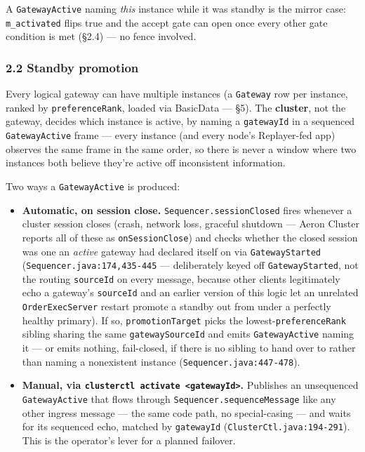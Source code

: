 \documentclass[
  10pt,
]{article}
\newcounter{none} %
\providecommand{\tightlist}{%
  \setlength{\itemsep}{0pt}\setlength{\parskip}{0pt}}
\begin{document}
A \texttt{GatewayActive} naming \emph{this} instance while it was
standby is the mirror case: \texttt{m\_activated} flips true and the
accept gate can open once every other gate condition is met (§2.4) ---
no fence involved.

\subsubsection{2.2 Standby promotion}\label{standby-promotion}

Every logical gateway can have multiple instances (a \texttt{Gateway}
row per instance, ranked by \texttt{preferenceRank}, loaded via
BasicData --- §5). The \textbf{cluster}, not the gateway, decides which
instance is active, by naming a \texttt{gatewayId} in a sequenced
\texttt{GatewayActive} frame --- every instance (and every node's
Replayer-fed app) observes the same frame in the same order, so there is
never a window where two instances both believe they're active off
inconsistent information.

Two ways a \texttt{GatewayActive} is produced:

\begin{itemize}
\tightlist
\item
  \textbf{Automatic, on session close.} \texttt{Sequencer.sessionClosed}
  fires whenever a cluster session closes (crash, network loss, graceful
  shutdown --- Aeron Cluster reports all of these as
  \texttt{onSessionClose}) and checks whether the closed session was one
  an \emph{active} gateway had declared itself on via
  \texttt{GatewayStarted} (\texttt{Sequencer.java:174,435-445} ---
  deliberately keyed off \texttt{GatewayStarted}, not the routing
  \texttt{sourceId} on every message, because other clients legitimately
  echo a gateway's \texttt{sourceId} and an earlier version of this
  logic let an unrelated \texttt{OrderExecServer} restart promote a
  standby out from under a perfectly healthy primary). If so,
  \texttt{promotionTarget} picks the lowest-\texttt{preferenceRank}
  sibling sharing the same \texttt{gatewaySourceId} and emits
  \texttt{GatewayActive} naming it --- or emits nothing, fail-closed, if
  there is no sibling to hand over to rather than naming a nonexistent
  instance (\texttt{Sequencer.java:447-478}).
\item
  \textbf{Manual, via
  \texttt{clusterctl\ activate\ \textless{}gatewayId\textgreater{}}.}
  Publishes an unsequenced \texttt{GatewayActive} that flows through
  \texttt{Sequencer.sequenceMessage} like any other ingress message ---
  the same code path, no special-casing --- and waits for its sequenced
  echo, matched by \texttt{gatewayId}
  (\texttt{ClusterCtl.java:194-291}). This is the operator's lever for a
  planned failover.
\end{itemize}
\end{document}
